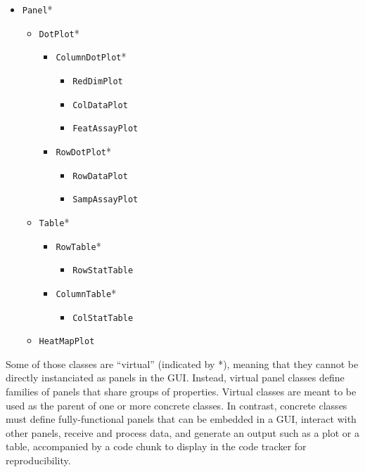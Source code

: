 \documentclass[]{book}
\providecommand{\tightlist}{%
  \setlength{\itemsep}{0pt}\setlength{\parskip}{0pt}}
\begin{document}
\begin{itemize}
\tightlist
\item
  \texttt{Panel}*

  \begin{itemize}
  \tightlist
  \item
    \texttt{DotPlot}*

    \begin{itemize}
    \tightlist
    \item
      \texttt{ColumnDotPlot}*

      \begin{itemize}
      \tightlist
      \item
        \texttt{RedDimPlot}
      \item
        \texttt{ColDataPlot}
      \item
        \texttt{FeatAssayPlot}
      \end{itemize}
    \item
      \texttt{RowDotPlot}*

      \begin{itemize}
      \tightlist
      \item
        \texttt{RowDataPlot}
      \item
        \texttt{SampAssayPlot}
      \end{itemize}
    \end{itemize}
  \item
    \texttt{Table}*

    \begin{itemize}
    \tightlist
    \item
      \texttt{RowTable}*

      \begin{itemize}
      \tightlist
      \item
        \texttt{RowStatTable}
      \end{itemize}
    \item
      \texttt{ColumnTable}*

      \begin{itemize}
      \tightlist
      \item
        \texttt{ColStatTable}
      \end{itemize}
    \end{itemize}
  \item
    \texttt{HeatMapPlot}
  \end{itemize}
\end{itemize}

Some of those classes are ``virtual'' (indicated by *), meaning that they cannot be directly instanciated as panels in the GUI.
Instead, virtual panel classes define families of panels that share groups of properties.
Virtual classes are meant to be used as the parent of one or more concrete classes.
In contrast, concrete classes must define fully-functional panels that can be embedded in a GUI, interact with other panels, receive and process data, and generate an output such as a plot or a table, accompanied by a code chunk to display in the code tracker for reproducibility.
\end{document}
